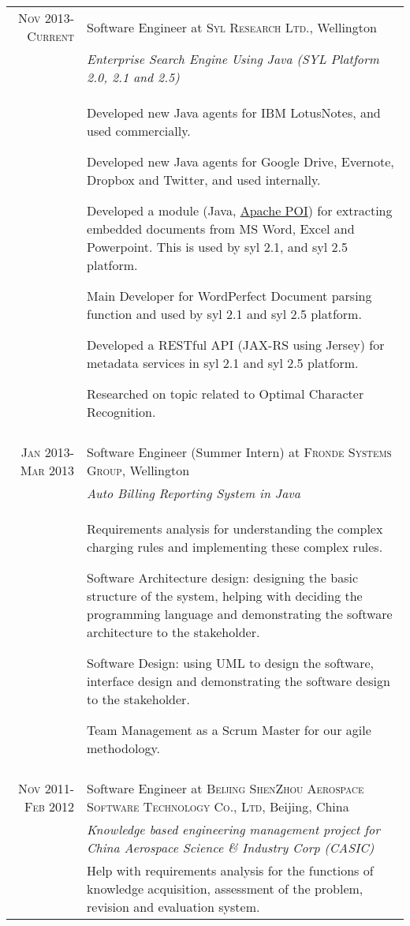\documentclass[a4paper,10pt]{article} %
\begin{document}
\begin{tabular}{r|p{11cm}}
\textsc{Nov 2013-Current} & Software Engineer at \textsc{Syl Research Ltd.}, Wellington \\
& \emph{Enterprise Search Engine Using Java (SYL Platform 2.0, 2.1 and 2.5)}\\ 
& \footnotesize{
Developed new Java agents for IBM LotusNotes, and used commercially.

Developed new Java agents for Google Drive, Evernote, Dropbox and Twitter, and used internally.

Developed a module (Java,  \href{http://poi.apache.org/}{Apache POI}) for extracting embedded documents from MS Word, Excel and Powerpoint. This is used by syl 2.1, and syl 2.5 platform.

Main Developer for WordPerfect Document parsing function and used by syl 2.1 and syl 2.5 platform.

Developed a RESTful API (JAX-RS using Jersey) for metadata services in syl 2.1 and syl 2.5 platform.

Researched on topic related to Optimal Character Recognition.
}\\
\multicolumn{2}{c}{} \\



\textsc{Jan 2013-Mar 2013} & Software Engineer (Summer Intern) at \textsc{Fronde Systems Group}, Wellington \\
& \emph{Auto Billing Reporting System in Java}\\ 
& \footnotesize{
Requirements analysis for understanding the complex charging rules and implementing these complex rules.

Software Architecture design: designing the basic structure of the system, helping with deciding the programming language and demonstrating the software architecture to the stakeholder.

Software Design: using UML to design the software, interface design and demonstrating the software design to the stakeholder.

Team Management as a Scrum Master for our agile methodology.
}\\
\multicolumn{2}{c}{} \\



\textsc{Nov 2011-Feb 2012} & Software Engineer at \textsc{Beijing ShenZhou Aerospace Software Technology Co., Ltd}, Beijing, China \\
&\emph{Knowledge based engineering management project for China Aerospace Science \& Industry Corp (CASIC)}\\
& \footnotesize{
Help with requirements analysis for the functions of knowledge acquisition, assessment of the problem, revision and evaluation system.

}
\end{tabular}
\end{document}
